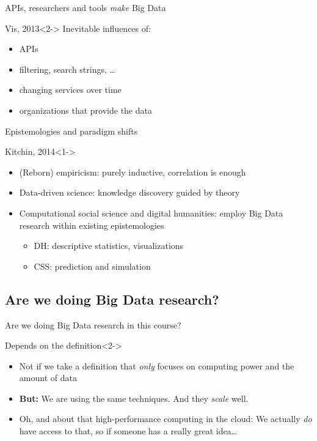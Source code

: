 \documentclass{beamer}
\begin{document}
\begin{frame}{APIs, researchers and tools \emph{make} Big Data}
\begin{block}{Vis, 2013}<2->
Inevitable influences of:
\begin{itemize}
\item APIs
\item filtering, search strings, \ldots
\item changing services over time
\item organizations that provide the data
\end{itemize}
\end{block}
\end{frame}


\begin{frame}{Epistemologies and paradigm shifts}
	\begin{block}{Kitchin, 2014}<1->
		\begin{itemize}
			\item<2-> (Reborn) empiricism: purely inductive, correlation is enough
			\item<3-> Data-driven science: knowledge discovery guided by theory
			\item<4-> Computational social science and digital humanities: employ Big Data research within existing epistemologies
			\begin{itemize}
				\item DH: descriptive statistics, visualizations
				\item CSS: prediction and simulation
			\end{itemize}
		\end{itemize}
	\end{block}
\end{frame}




\subsection{Are we doing Big Data research?}

\begin{frame}{Are we doing Big Data research in this course?}
\begin{block}{Depends on the definition}<2->
\begin{itemize}
\item Not if we take a definition that \emph{only} focuses on computing power and the amount of data
\item<3-> \textbf{But:} We are using the same techniques. And they \emph{scale} well.
\item<4-> Oh, and about that high-performance computing in the cloud: We actually \emph{do} have access to that, so if someone has a really great idea\ldots
\end{itemize}

\end{block}
\end{frame}
\end{document}

